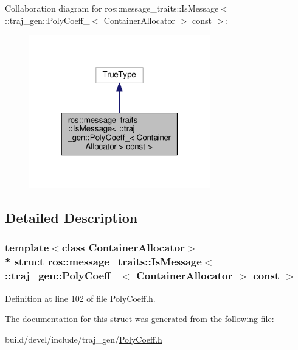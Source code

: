 Collaboration diagram for ros\+:\+:message\+\_\+traits\+:\+:Is\+Message$<$ \+:\+:traj\+\_\+gen\+:\+:Poly\+Coeff\+\_\+$<$ Container\+Allocator $>$ const $>$\+:
\nopagebreak
\begin{figure}[H]
\begin{center}
\leavevmode
\includegraphics[width=223pt]{structros_1_1message__traits_1_1_is_message_3_01_1_1traj__gen_1_1_poly_coeff___3_01_container_al2577931a96f19390b5b41be1deb5c560}
\end{center}
\end{figure}


\subsection{Detailed Description}
\subsubsection*{template$<$class Container\+Allocator$>$\\*
struct ros\+::message\+\_\+traits\+::\+Is\+Message$<$ \+::traj\+\_\+gen\+::\+Poly\+Coeff\+\_\+$<$ Container\+Allocator $>$ const  $>$}



Definition at line 102 of file Poly\+Coeff.\+h.



The documentation for this struct was generated from the following file\+:\begin{DoxyCompactItemize}
\item 
build/devel/include/traj\+\_\+gen/\hyperlink{_poly_coeff_8h}{Poly\+Coeff.\+h}\end{DoxyCompactItemize}
